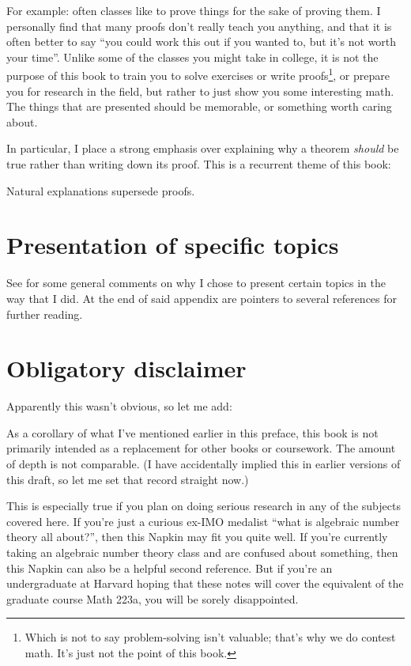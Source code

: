 For example: often classes like to prove things for the sake of proving them.
I personally find that many proofs don't really teach you anything,
and that it is often better to say ``you could work this out if you wanted to,
but it's not worth your time''.
Unlike some of the classes you might take in college,
it is not the purpose of this book to train you to solve exercises
or write proofs\footnote{%
	Which is not to say problem-solving isn't valuable;
	that's why we do contest math.
	It's just not the point of this book.},
or prepare you for research in the field,
but rather to just show you some interesting math.
The things that are presented should be memorable,
or something worth caring about.

In particular, I place a strong emphasis over explaining
why a theorem \emph{should} be true rather than writing down its proof.
This is a recurrent theme of this book:
\begin{moral}
	Natural explanations supersede proofs.
\end{moral}

\section*{Presentation of specific topics}
See  for some general comments on why I chose
to present certain topics in the way that I did.
At the end of said appendix are pointers to
several references for further reading.

\section*{Obligatory disclaimer}
Apparently this wasn't obvious, so let me add:

As a corollary of what I've mentioned earlier in this preface,
this book is not primarily intended as a replacement for other books or coursework.
The amount of depth is not comparable.
(I have accidentally implied this in earlier versions of this draft,
so let me set that record straight now.)

This is especially true if you plan on doing serious research
in any of the subjects covered here.
If you're just a curious ex-IMO medalist ``what is algebraic number theory all about?'',
then this Napkin may fit you quite well.
If you're currently taking an algebraic number theory class and are confused
about something, then this Napkin can also be a helpful second reference.
But if you're an undergraduate at Harvard hoping that these notes
will cover the equivalent of the graduate course Math 223a,
you will be sorely disappointed.

